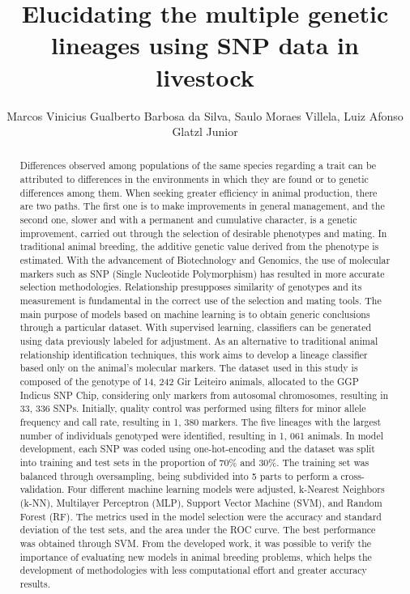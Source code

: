 \documentclass[twoside]{article}
\title{\vspace{-15mm}\fontsize{24pt}{10pt}\selectfont\textbf{ Elucidating the multiple genetic lineages using SNP data in livestock }} %
\author{ Marcos Vinicius Gualberto Barbosa da Silva,  Saulo Moraes Villela,  Luiz Afonso Glatzl Junior }
\affil{ UNIVERSIDADE FEDERAL DE JUIZ DE FORA }
\date{}
\begin{document}
  
  
  \maketitle %
  
  
  \thispagestyle{fancy} %
  
  
  \begin{abstract}
  Differences observed among populations of the same species regarding a trait can be attributed to differences in the environments in which they are found or to genetic differences among them. When seeking greater efficiency in animal production,  there are two paths. The first one is to make improvements in general management,  and the second one,  slower and with a permanent and cumulative character,  is a genetic improvement,  carried out through the selection of desirable phenotypes and mating. In traditional animal breeding,  the additive genetic value derived from the phenotype is estimated. With the advancement of Biotechnology and Genomics,  the use of molecular markers such as SNP (Single Nucleotide Polymorphism) has resulted in more accurate selection methodologies. Relationship presupposes similarity of genotypes and its measurement is fundamental in the correct use of the selection and mating tools. The main purpose of models based on machine learning is to obtain generic conclusions through a particular dataset. With supervised learning,  classifiers can be generated using data previously labeled for adjustment. As an alternative to traditional animal relationship identification techniques,  this work aims to develop a lineage classifier based only on the animal’s molecular markers. The dataset used in this study is composed of the genotype of 14, 242 Gir Leiteiro animals,  allocated to the GGP Indicus SNP Chip,  considering only markers from autosomal chromosomes,  resulting in 33, 336 SNPs. Initially,  quality control was performed using filters for minor allele frequency and call rate,  resulting in 1, 380 markers. The five lineages with the largest number of individuals genotyped were identified,  resulting in 1, 061 animals. In model development,  each SNP was coded using one-hot-encoding and the dataset was split into training and test sets in the proportion of 70\% and 30\%. The training set was balanced through oversampling,  being subdivided into 5 parts to perform a cross-validation. Four different machine learning models were adjusted,  k-Nearest Neighbors (k-NN),  Multilayer Perceptron (MLP),  Support Vector Machine (SVM),  and Random Forest (RF). The metrics used in the model selection were the accuracy and standard deviation of the test sets,  and the area under the ROC curve. The best performance was obtained through SVM. From the developed work,  it was possible to verify the importance of evaluating new models in animal breeding problems,  which helps the development of methodologies with less computational effort and greater accuracy results.
  

\end{abstract}
\end{document}
